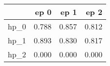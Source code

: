 \begin{tabular}{lrrr}
\toprule
{} &   ep 0 &   ep 1 &   ep 2 \\
\midrule
hp\_0 &  0.788 &  0.857 &  0.812 \\
hp\_1 &  0.893 &  0.830 &  0.817 \\
hp\_2 &  0.000 &  0.000 &  0.000 \\
\bottomrule
\end{tabular}
